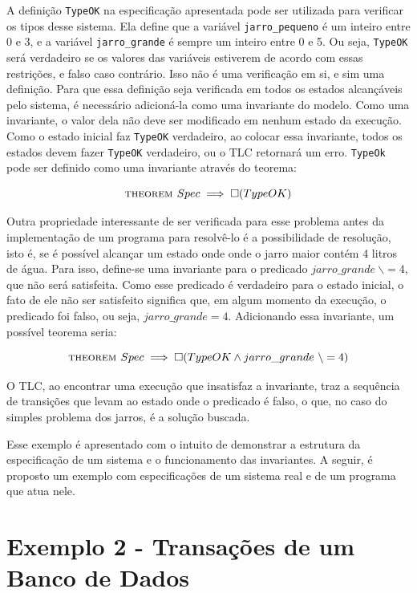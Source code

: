 A definição \texttt{TypeOK} na especificação apresentada pode ser utilizada para verificar os tipos desse sistema. Ela define que a variável \texttt{jarro\_pequeno} é um inteiro entre 0 e 3, e a variável \texttt{jarro\_grande} é sempre um inteiro entre 0 e 5. Ou seja, \texttt{TypeOK} será verdadeiro se os valores das variáveis estiverem de acordo com essas restrições, e falso caso contrário. Isso não é uma verificação em si, e sim uma definição. Para que essa definição seja verificada em todos os estados alcançáveis pelo sistema, é necessário adicioná-la como uma invariante do modelo. Como uma invariante, o valor dela não deve ser modificado em nenhum estado da execução. Como o estado inicial faz \texttt{TypeOK} verdadeiro, ao colocar essa invariante, todos os estados devem fazer \texttt{TypeOK} verdadeiro, ou o TLC retornará um erro. \texttt{TypeOk} pode ser definido como uma invariante através do teorema:

\[\textsc{theorem } Spec \implies \square (TypeOK)\]

Outra propriedade interessante de ser verificada para esse problema antes da implementação de um programa para resolvê-lo é a possibilidade de resolução, isto é, se é possível alcançar um estado onde onde o jarro maior contém 4 litros de água. Para isso, define-se uma invariante para o predicado $jarro\_grande\ \backslash= 4$, que não será satisfeita. Como esse predicado é verdadeiro para o estado inicial, o fato de ele não ser satisfeito significa que, em algum momento da execução, o predicado foi falso, ou seja, $jarro\_grande = 4$. Adicionando essa invariante, um possível teorema seria:

\[\textsc{theorem } Spec \implies \square (TypeOK \land jarro\_grande\ \backslash= 4)\]

O TLC, ao encontrar uma execução que insatisfaz a invariante, traz a sequência de transições que levam ao estado onde o predicado é falso, o que, no caso do simples problema dos jarros, é a solução buscada.

Esse exemplo é apresentado com o intuito de demonstrar a estrutura da especificação de um sistema e o funcionamento das invariantes. A seguir, é proposto um exemplo com especificações de um sistema real e de um programa que atua nele.

\section{Exemplo 2 - Transações de um Banco de Dados}

